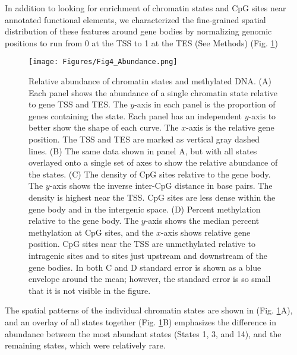 \documentclass[
  11pt,
]{article}
\providecommand{\DIFaddbeginFL}{} %
\providecommand{\DIFaddendFL}{} %
\providecommand{\DIFdelbeginFL}{} %
\providecommand{\DIFdelendFL}{} %
\newcommand{\DIFscaledelfig}{0.5}
\newlength{\DIFdelgraphicswidth} %
\newlength{\DIFdelgraphicsheight} %
\newcommand{\DIFaddincludegraphics}[2][]{{\color{blue}\fbox{\DIFOincludegraphics[#1]{#2}}}} %
\newcommand{\DIFdelincludegraphics}[2][]{%
\sbox{\DIFdelgraphicsbox}{\DIFOincludegraphics[#1]{#2}}%
\settoboxwidth{\DIFdelgraphicswidth}{\DIFdelgraphicsbox} %
\settoboxtotalheight{\DIFdelgraphicsheight}{\DIFdelgraphicsbox} %
\scalebox{\DIFscaledelfig}{%
\parbox[b]{\DIFdelgraphicswidth}{\usebox{\DIFdelgraphicsbox}\\[-\baselineskip] \rule{\DIFdelgraphicswidth}{0em}}\llap{\resizebox{\DIFdelgraphicswidth}{\DIFdelgraphicsheight}{%
\setlength{\unitlength}{\DIFdelgraphicswidth}%
\begin{picture}(1,1)%
\thicklines\linethickness{2pt} %
{\color[rgb]{1,0,0}\put(0,0){\framebox(1,1){}}}%
{\color[rgb]{1,0,0}\put(0,0){\line( 1,1){1}}}%
{\color[rgb]{1,0,0}\put(0,1){\line(1,-1){1}}}%
\end{picture}%
}\hspace*{3pt}}} %
} %
\DeclareRobustCommand{\DIFaddbeginFL}{\DIFOaddbeginFL \let\includegraphics\DIFaddincludegraphics} %
\DeclareRobustCommand{\DIFaddendFL}{\DIFOaddendFL \let\includegraphics\DIFOincludegraphics} %
\DeclareRobustCommand{\DIFdelbeginFL}{\DIFOdelbeginFL \let\includegraphics\DIFdelincludegraphics} %
\DeclareRobustCommand{\DIFdelendFL}{\DIFOaddendFL \let\includegraphics\DIFOincludegraphics} %
\begin{document}
In addition to looking for enrichment of chromatin states and CpG sites
near annotated functional elements, we characterized the fine-grained
spatial distribution of these features around gene bodies by normalizing
genomic positions to run from 0 at the TSS to 1 at the TES (See Methods)
(Fig. \ref{fig:state_abundance})

\begin{figure}[ht!]
\DIFdelbeginFL %
\DIFdelendFL \DIFaddbeginFL \texttt{[image: Figures/Fig4\_Abundance.png]} 
\DIFaddendFL \caption{Relative abundance of chromatin states and methylated DNA. (A) Each panel 
shows the abundance of a single chromatin state relative to gene TSS and TES. The 
$y$-axis in each panel is the proportion of genes containing the state. Each
panel has an independent $y$-axis to better show the shape of each curve.
The $x$-axis is the relative gene position. The TSS and TES are marked as vertical
gray dashed lines. (B) The same data shown in panel A, but with all states overlayed
onto a single set of axes to show the relative abundance of the states. 
(C) The density of CpG sites relative to the gene body. The $y$-axis shows 
the inverse inter-CpG distance in base pairs. The density is highest near the 
TSS. CpG sites are less dense within the gene body and in the intergenic space. 
(D) Percent methylation relative to the gene body. The $y$-axis shows the median 
percent methylation at CpG sites, and the $x$-axis shows relative gene position. 
CpG sites near the TSS are unmethylated relative to intragenic sites and to sites
just upstream and downstream of the gene bodies. In both C and D standard error 
is shown as a blue envelope around the mean; however, the standard error is so 
small that it is not visible in the figure.}
\label{fig:state_abundance}
\end{figure}

The spatial patterns of the individual chromatin states are shown in
(Fig. \ref{fig:state_abundance}A), and an overlay of all states together
(Fig. \ref{fig:state_abundance}B) emphasizes the difference in abundance
between the most abundant states (States 1, 3, and 14), and the
remaining states, which were relatively rare.
\end{document}
